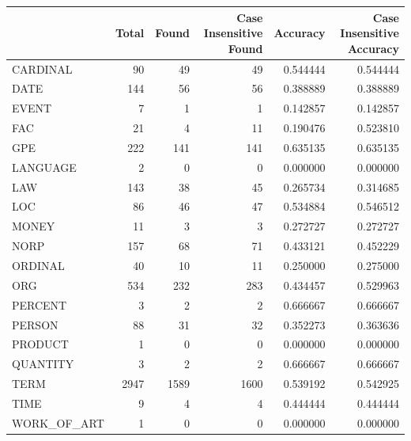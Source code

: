 \begin{tabular}{lrrrrr}
\toprule
 & Total & Found & Case Insensitive Found & Accuracy & Case Insensitive Accuracy \\
\midrule
CARDINAL & 90 & 49 & 49 & 0.544444 & 0.544444 \\
DATE & 144 & 56 & 56 & 0.388889 & 0.388889 \\
EVENT & 7 & 1 & 1 & 0.142857 & 0.142857 \\
FAC & 21 & 4 & 11 & 0.190476 & 0.523810 \\
GPE & 222 & 141 & 141 & 0.635135 & 0.635135 \\
LANGUAGE & 2 & 0 & 0 & 0.000000 & 0.000000 \\
LAW & 143 & 38 & 45 & 0.265734 & 0.314685 \\
LOC & 86 & 46 & 47 & 0.534884 & 0.546512 \\
MONEY & 11 & 3 & 3 & 0.272727 & 0.272727 \\
NORP & 157 & 68 & 71 & 0.433121 & 0.452229 \\
ORDINAL & 40 & 10 & 11 & 0.250000 & 0.275000 \\
ORG & 534 & 232 & 283 & 0.434457 & 0.529963 \\
PERCENT & 3 & 2 & 2 & 0.666667 & 0.666667 \\
PERSON & 88 & 31 & 32 & 0.352273 & 0.363636 \\
PRODUCT & 1 & 0 & 0 & 0.000000 & 0.000000 \\
QUANTITY & 3 & 2 & 2 & 0.666667 & 0.666667 \\
TERM & 2947 & 1589 & 1600 & 0.539192 & 0.542925 \\
TIME & 9 & 4 & 4 & 0.444444 & 0.444444 \\
WORK_OF_ART & 1 & 0 & 0 & 0.000000 & 0.000000 \\
\bottomrule
\end{tabular}
